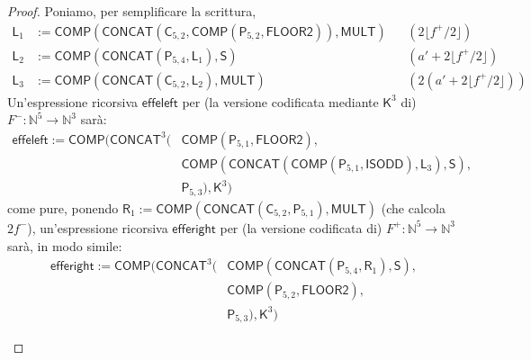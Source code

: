\begin{proof}
\noindent Poniamo, per semplificare la scrittura,
\begin{align*}
\mathsf L_1&:=\mathsf{COMP}(\mathsf{CONCAT}(\mathsf C_{5,2},\mathsf{COMP}(\mathsf P_{5,2},\mathsf{FLOOR2})),\mathsf{MULT}) &&(2\lfloor f^+/2\rfloor)\\
\mathsf L_2&:=\mathsf{COMP}(\mathsf{CONCAT}(\mathsf P_{5,4},\mathsf L_1),\mathsf S) &&(a'+2\lfloor f^+/2\rfloor)\\
\mathsf L_3&:=\mathsf{COMP}(\mathsf{CONCAT}(\mathsf C_{5,2},\mathsf L_2),\mathsf{MULT}) &&(2(a'+2\lfloor f^+/2\rfloor))
\end{align*}
Un'espressione ricorsiva $\mathsf{effeleft}$ per (la versione codificata mediante $\mathsf K^3$ di) $F^-\colon\mathbb N^5\to\mathbb N^3$ sarà:
\begin{align*}
\mathsf{effeleft}:=\mathsf{COMP}\Big(\mathsf{CONCAT}^3\Big(&\mathsf{COMP}(\mathsf P_{5,1},\mathsf{FLOOR2}),\\
&\mathsf{COMP}(\mathsf{CONCAT}(\mathsf{COMP}(\mathsf P_{5,1},\mathsf{ISODD}),\mathsf L_3),\mathsf S),\\
&\mathsf P_{5,3}\Big),\mathsf K^3\Big)
\end{align*}
come pure, ponendo $\mathsf R_1:=\mathsf{COMP}(\mathsf{CONCAT}(\mathsf C_{5,2},\mathsf P_{5,1}),\mathsf{MULT})$ (che calcola $2f^-$), un'espressione ricorsiva $\mathsf{efferight}$ per (la versione codificata di) $F^+\colon\mathbb N^5\to\mathbb N^3$ sarà, in modo simile:
\begin{align*}
\mathsf{efferight}:=\mathsf{COMP}\Big(\mathsf{CONCAT}^3\Big(&\mathsf{COMP}(\mathsf{CONCAT}(\mathsf P_{5,4},\mathsf R_1),\mathsf S),\\
&\mathsf{COMP}(\mathsf P_{5,2},\mathsf{FLOOR2}),\\
&\mathsf P_{5,3}\Big),\mathsf K^3\Big)
\end{align*}

\begin{figure}[H]
\centering
{}
\end{figure}
\end{proof}
